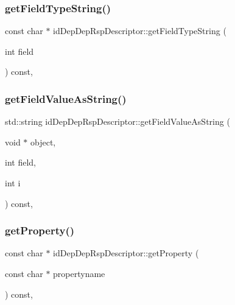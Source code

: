 \subsubsection{\texorpdfstring{get\+Field\+Type\+String()}{getFieldTypeString()}}
{\footnotesize\ttfamily const char $\ast$ id\+Dep\+Dep\+Rsp\+Descriptor\+::get\+Field\+Type\+String (\begin{DoxyParamCaption}\item[{int}]{field }\end{DoxyParamCaption}) const\hspace{0.3cm}{\ttfamily [override]}, {\ttfamily [virtual]}}

\mbox{\label{classidDepDepRspDescriptor_a3f78b6586d3e0239bf8a530398d6db8c}} 
\subsubsection{\texorpdfstring{get\+Field\+Value\+As\+String()}{getFieldValueAsString()}}
{\footnotesize\ttfamily std\+::string id\+Dep\+Dep\+Rsp\+Descriptor\+::get\+Field\+Value\+As\+String (\begin{DoxyParamCaption}\item[{void $\ast$}]{object,  }\item[{int}]{field,  }\item[{int}]{i }\end{DoxyParamCaption}) const\hspace{0.3cm}{\ttfamily [override]}, {\ttfamily [virtual]}}

\mbox{\label{classidDepDepRspDescriptor_ad149f4ccae414eb97ce9959fe4b852c7}} 
\subsubsection{\texorpdfstring{get\+Property()}{getProperty()}}
{\footnotesize\ttfamily const char $\ast$ id\+Dep\+Dep\+Rsp\+Descriptor\+::get\+Property (\begin{DoxyParamCaption}\item[{const char $\ast$}]{propertyname }\end{DoxyParamCaption}) const\hspace{0.3cm}{\ttfamily [override]}, {\ttfamily [virtual]}}

